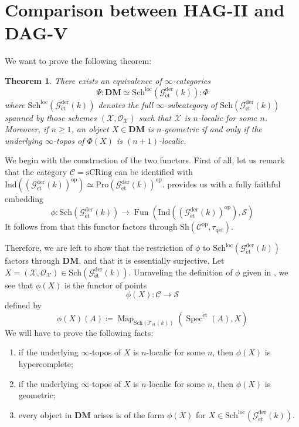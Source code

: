 \documentclass[12pt,a4paper,reqno]{amsart}
\theoremstyle{plain}
\newtheorem{thm}{Theorem}[section]
\theoremstyle{definition}
\theoremstyle{remark}
\numberwithin{equation}{section}
\begin{document}
\ifpersonal

\section{Comparison between HAG-II and DAG-V}

We want to prove the following theorem:

\begin{thm}
	There exists an equivalence of $\infty$-categories
	\[ \Psi \colon \mathbf{DM} \simeq \mathrm{Sch}^{\mathrm{loc}}({{\mathcal G}_{\mathrm{\acute{e}t}}^\mathrm{der}(k)}) \colon \Phi \]
	where $\mathrm{Sch}^{\mathrm{loc}}({{\mathcal G}_{\mathrm{\acute{e}t}}^\mathrm{der}(k)})$ denotes the full $\infty$-subcategory of $\mathrm{Sch}({{\mathcal G}_{\mathrm{\acute{e}t}}^\mathrm{der}(k)})$ spanned by those schemes $({\mathcal X}, {\mathcal O}_{\mathcal X})$ such that ${\mathcal X}$ is $n$-localic for some $n$.
	Moreover, if $n \ge 1$, an object $X \in \mathbf{DM}$ is $n$-geometric if and only if the underlying $\infty$-topos of $\Phi(X)$ is $(n+1)$-localic.
\end{thm}

We begin with the construction of the two functors.
First of all, let us remark that the category ${\mathcal C} = \mathrm{sCRing}$ can be identified with $\mathrm{Ind}(({{\mathcal G}_{\mathrm{\acute{e}t}}^\mathrm{der}(k)})^{\mathrm{op}}) \simeq \mathrm{Pro}({{\mathcal G}_{\mathrm{\acute{e}t}}^\mathrm{der}(k)})^{\mathrm{op}}$.
\cite[Theorem 2.4.1]{DAG-V} provides us with a fully faithful embedding
\[ \phi \colon \mathrm{Sch}({{\mathcal G}_{\mathrm{\acute{e}t}}^\mathrm{der}(k)}) \to \operatorname{Fun}(\mathrm{Ind}(({{\mathcal G}_{\mathrm{\acute{e}t}}^\mathrm{der}(k)})^{\mathrm{op}}), {\mathcal S}) \]
It follows from \cite[Lemma 2.4.13]{DAG-V} that this functor factors through ${\mathrm{Sh}}({\mathcal C}^{\mathrm{op}}, {\tau_\mathrm{q\acute{e}t}})$.

Therefore, we are left to show that the restriction of $\phi$ to $\mathrm{Sch}^{\mathrm{loc}}({{\mathcal G}_{\mathrm{\acute{e}t}}^\mathrm{der}(k)})$ factors through $\mathbf{DM}$, and that it is essentially surjective.
Let $X = ({\mathcal X}, {\mathcal O}_{\mathcal X}) \in \mathrm{Sch}({{\mathcal G}_{\mathrm{\acute{e}t}}^\mathrm{der}(k)})$.
Unraveling the definition of $\phi$ given in \cite[Theorem 2.4.1]{DAG-V}, we see that $\phi(X)$ is the functor of points
\[ \phi(X) \colon {\mathcal C} \to {\mathcal S} \]
defined by
\[ \phi(X)(A) \coloneqq \operatorname{Map}_{\mathrm{Sch}({{\mathcal T}_{\mathrm{\acute{e}t}}(k)})}(\operatorname{Spec}^{\mathrm{\acute{e}t}}(A), X) \]
We will have to prove the following facts:
\begin{enumerate}
	\item if the underlying $\infty$-topos of $X$ is $n$-localic for some $n$, then $\phi(X)$ is hypercomplete;
	\item if the underlying $\infty$-topos of $X$ is $n$-localic for some $n$, then $\phi(X)$ is geometric;
	\item every object in $\mathbf{DM}$ arises is of the form $\phi(X)$ for $X \in \mathrm{Sch}^{\mathrm{loc}}({{\mathcal G}_{\mathrm{\acute{e}t}}^\mathrm{der}(k)})$.
\end{enumerate}
\end{document}
